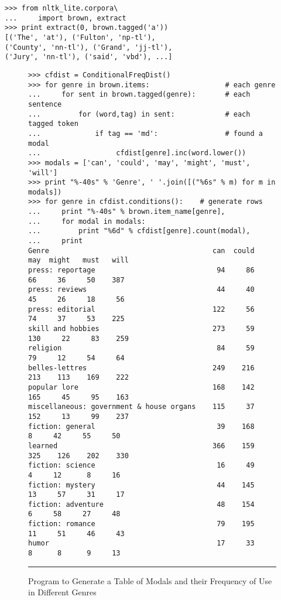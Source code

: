 \documentclass[11pt]{article}
\begin{document}
{\small\begin{verbatim}
>>> from nltk_lite.corpora\
...     import brown, extract
>>> print extract(0, brown.tagged('a'))
[('The', 'at'), ('Fulton', 'np-tl'),
('County', 'nn-tl'), ('Grand', 'jj-tl'),
('Jury', 'nn-tl'), ('said', 'vbd'), ...]
\end{verbatim}}

\begin{figure*}[t]
{\small\begin{verbatim}
>>> cfdist = ConditionalFreqDist()
>>> for genre in brown.items:                  # each genre
...     for sent in brown.tagged(genre):       # each sentence
...         for (word,tag) in sent:            # each tagged token
...             if tag == 'md':                # found a modal
...                  cfdist[genre].inc(word.lower())
>>> modals = ['can', 'could', 'may', 'might', 'must', 'will']
>>> print "%-40s" % 'Genre', ' '.join([("%6s" % m) for m in modals])
>>> for genre in cfdist.conditions():    # generate rows
...     print "%-40s" % brown.item_name[genre],
...     for modal in modals:
...         print "%6d" % cfdist[genre].count(modal),
...     print
Genre                                       can  could    may  might   must   will
press: reportage                             94     86     66     36     50    387
press: reviews                               44     40     45     26     18     56
press: editorial                            122     56     74     37     53    225
skill and hobbies                           273     59    130     22     83    259
religion                                     84     59     79     12     54     64
belles-lettres                              249    216    213    113    169    222
popular lore                                168    142    165     45     95    163
miscellaneous: government & house organs    115     37    152     13     99    237
fiction: general                             39    168      8     42     55     50
learned                                     366    159    325    126    202    330
fiction: science                             16     49      4     12      8     16
fiction: mystery                             44    145     13     57     31     17
fiction: adventure                           48    154      6     58     27     48
fiction: romance                             79    195     11     51     46     43
humor                                        17     33      8      8      9     13
\end{verbatim}}
\caption{Program to Generate a Table of Modals and their Frequency of Use in Different Genres\label{fig:genre}}
\vspace{1ex}\hrule
\end{figure*}
\end{document}
